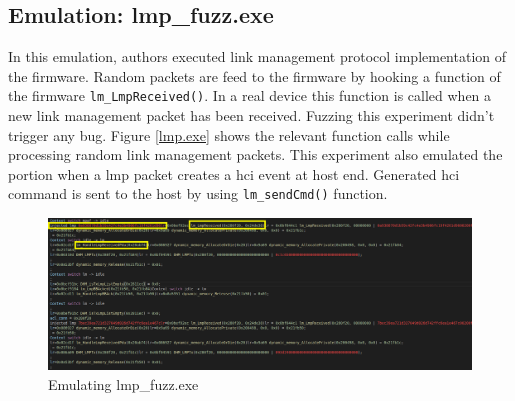 \documentclass[letterpaper,11pt]{article}
\begin{document}
\subsection{Emulation: lmp\_fuzz.exe} 
In this emulation, authors executed link management protocol implementation of the firmware. Random packets are feed to the firmware by hooking a function of the firmware \verb|lm_LmpReceived()|. In a real device this function is called when a new link management packet has been received. Fuzzing this experiment didn't trigger any bug. Figure \ref{lmp.exe} shows the relevant function calls while processing random link management packets. This experiment also emulated the portion when a lmp packet creates a hci event at host end. Generated hci command is sent to the host by using \verb|lm_sendCmd()| function. 
\begin{figure}[!h]
    \centering
    \includegraphics[width=\textwidth]{images/injected_lmp.png}
    \caption{Emulating lmp\_fuzz.exe}
    \label{fig:lmp.exe}
\end{figure}
\end{document}
